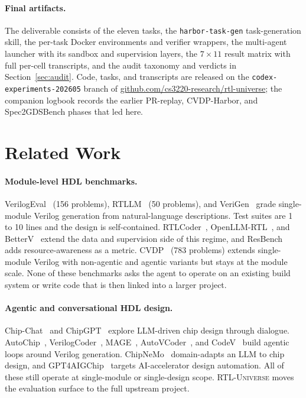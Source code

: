 \documentclass{article}
\begin{document}
\paragraph{Final artifacts.}
The deliverable consists of the eleven tasks, the \texttt{harbor-task-gen}
task-generation skill, the per-task Docker environments and verifier wrappers, the
multi-agent launcher with its sandbox and supervision layers, the $7\times 11$ result
matrix with full per-cell transcripts, and the audit taxonomy and verdicts in
Section~\ref{sec:audit}. Code, tasks, and transcripts are released on the
\texttt{codex-experiments-202605} branch of
\url{github.com/cs3220-research/rtl-universe}; the companion logbook records the earlier
PR-replay, CVDP-Harbor, and Spec2GDSBench phases that led here.

\section{Related Work}

\paragraph{Module-level HDL benchmarks.}
VerilogEval~\citep{verilogeval} (156 problems), RTLLM~\citep{rtllm} (50 problems), and
VeriGen~\citep{verigen} grade single-module Verilog generation from natural-language
descriptions. Test suites are 1 to 10 lines and the design is self-contained.
RTLCoder~\citep{rtlcoder}, OpenLLM-RTL~\citep{openllmrtl}, and BetterV~\citep{betterv}
extend the data and supervision side of this regime, and ResBench~\citep{resbench} adds
resource-awareness as a metric. CVDP~\citep{nvidia2024cvdp} (783 problems) extends
single-module Verilog with non-agentic and agentic variants but stays at the module scale.
None of these benchmarks asks the agent to operate on an existing build system or write
code that is then linked into a larger project.

\paragraph{Agentic and conversational HDL design.}
Chip-Chat~\citep{chipchat} and ChipGPT~\citep{chipgpt} explore LLM-driven chip design
through dialogue. AutoChip~\citep{autochip}, VerilogCoder~\citep{verilogcoder},
MAGE~\citep{mage}, AutoVCoder~\citep{autovcoder}, and CodeV~\citep{codev} build agentic
loops around Verilog generation. ChipNeMo~\citep{chipnemo} domain-adapts an LLM to chip
design, and GPT4AIGChip~\citep{gpt4aigchip} targets AI-accelerator design automation. All
of these still operate at single-module or single-design scope. \textsc{RTL-Universe}
moves the evaluation surface to the full upstream project.
\end{document}
